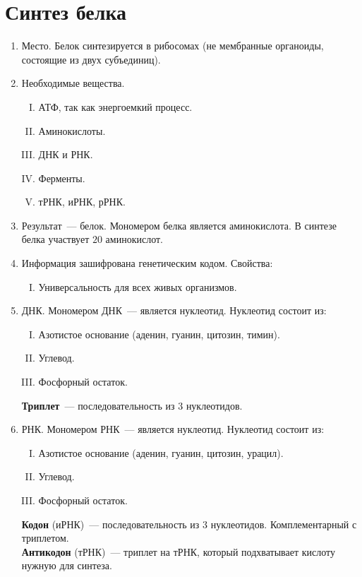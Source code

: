 \documentclass[12pt]{article}
\begin{document}
	\section{Синтез белка}
	\begin{enumerate}
		\item Место. Белок синтезируется в рибосомах (не мембранные органоиды, состоящие из двух субъединиц).
		\item Необходимые вещества.
		\begin{enumerate}[I.]
			\item АТФ, так как энергоемкий процесс.
			\item Аминокислоты.
			\item ДНК и РНК.
			\item Ферменты.
			\item тРНК, иРНК, рРНК.
		\end{enumerate}
		\item Результат~--- белок. Мономером белка является аминокислота. В синтезе белка участвует $20$ аминокислот.
		\item Информация зашифрована генетическим кодом.
		Свойства:
		\begin{enumerate}[I.]
			\item Универсальность для всех живых организмов.
		\end{enumerate}
		\item ДНК. Мономером ДНК~--- является нуклеотид.
		Нуклеотид состоит из:
		\begin{enumerate}[I.]
			\item Азотистое основание (аденин, гуанин, цитозин, тимин).
			\item Углевод.
			\item Фосфорный остаток.
		\end{enumerate}
		\textbf{Триплет}~--- последовательность из $3$ нуклеотидов.
		\item РНК. Мономером РНК~--- является нуклеотид.
		Нуклеотид состоит из:
		\begin{enumerate}[I.]
			\item Азотистое основание (аденин, гуанин, цитозин, урацил).
			\item Углевод.
			\item Фосфорный остаток.
		\end{enumerate}
		\textbf{Кодон} (иРНК)~--- последовательность из $3$ нуклеотидов. Комплементарный с триплетом. \\
		\textbf{Антикодон} (тРНК)~--- триплет на тРНК, который подхватывает кислоту нужную для синтеза.
	\end{enumerate}
\end{document}
